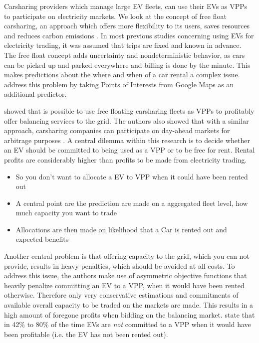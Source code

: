 \documentclass[12pt, article]{article}
\begin{document}
Carsharing providers which manage large EV fleets, can use their EVs as VPPs to
participate on electricity markets. We look at the concept of free float
carsharing, an approach which offers more flexibility to its users, saves
resources and reduces carbon emissions
\parencite{firnkorn15_free_float_elect_carsh_fleet_smart_cities}. In most previous
studies concerning using EVs for electricity trading, it was assumed that trips
are fixed and known in advance. The free float concept adds uncertainty and
nondeterministic behavior, as cars can be picked up and parked everywhere and
billing is done by the minute. This makes predictions about the where and when
of a car rental a complex issue. \textcite{wagner16_in_free_float} address this
problem by taking Points of Interests from Google Maps as an additional
predictor.

\textcite{tomic07_using_fleet_elect_drive_vehic_grid_suppor,kahlen17_fleet} showed
that is possible to use free floating carsharing fleets as VPPs to profitably
offer balancing services to the grid. The authors also showed that with a
similar approach, carsharing companies can participate on day-ahead markets for
arbitrage purposes \parencite{kahlen18_elect_vehic_virtual_power_plant_dilem}. A
central dilemma within this research is to decide whether an EV should be
committed to being used as a VPP or to be free for rent. Rental
profits are considerably higher than profits to be made from electricity
trading.

\begin{itemize}
\item So you don't want to allocate a EV to VPP when it could have been rented out
\item A central point are  the prediction are made on a aggregated fleet level, how
much capacity you want to trade
\item Allocations are then made on likelihood that a Car is rented out and expected
benefits
\end{itemize}

Another central problem is that offering capacity to the grid, which
you can not provide, results in heavy penalties, which should be avoided at all
costs. To address this issue, the authors make use of asymmetric objective
functions that heavily penalize committing an EV to a VPP, when it would have
been rented otherwise. Therefore only very conservative estimations and
commitments of available overall capacity to be traded on the markets are made.
This results in a high amount of foregone profits when bidding on the balancing
market. \textcite{kahlen15_aggreg_elect_cars_sustain_virtual_power_plant} state
that in 42\% to 80\% of the time EVs are \emph{not} committed to a VPP when it would have been
profitable (i.e. the EV has not been rented out).
\end{document}
